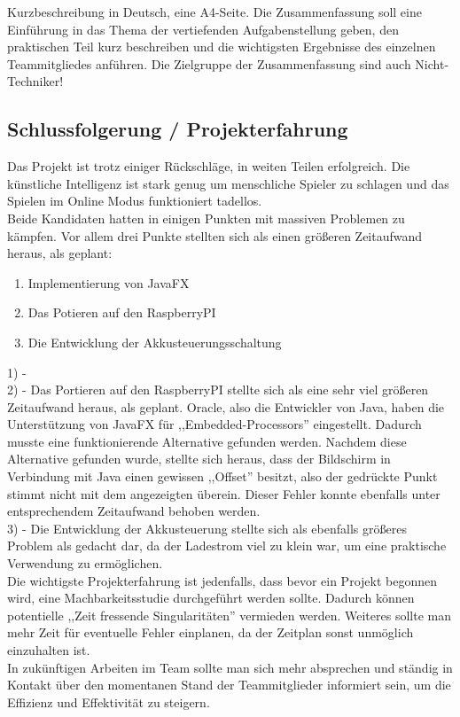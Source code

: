 \documentclass[12pt,a4paper]{article}
\newcommand{\yhbu}[0]{\color{ydkbu}}	%
\begin{document}
{	{\yhbu
	Kurzbeschreibung in Deutsch, eine A4-Seite.
	Die Zusammenfassung soll eine Einführung in das Thema
	der vertiefenden Aufgabenstellung geben,
	den praktischen Teil kurz beschreiben und die wichtigsten Ergebnisse
	des einzelnen Teammitgliedes anführen.
	Die Zielgruppe der Zusammenfassung sind auch Nicht-Techniker!
	}

\newpage
 \subsection{Schlussfolgerung / Projekterfahrung}
 
 Das Projekt ist trotz einiger Rückschläge, in weiten Teilen erfolgreich. Die künstliche Intelligenz ist stark genug um menschliche Spieler zu schlagen und das Spielen im Online Modus funktioniert tadellos. \\
 
	Beide Kandidaten hatten in einigen Punkten mit massiven Problemen zu kämpfen. Vor allem drei Punkte stellten sich als einen größeren Zeitaufwand heraus, als geplant:
\begin{enumerate}
	\item{Implementierung von JavaFX}
	\item{Das Potieren auf den RaspberryPI}
	\item{Die Entwicklung der Akkusteuerungsschaltung}
\end{enumerate}
1) - \\
2) - Das Portieren auf den RaspberryPI stellte sich als eine sehr viel größeren Zeitaufwand heraus, als geplant. Oracle, also die Entwickler von Java, haben die Unterstützung von JavaFX für ,,Embedded-Processors'' eingestellt. Dadurch musste eine funktionierende Alternative gefunden werden. Nachdem diese Alternative gefunden wurde, stellte sich heraus, dass der Bildschirm in Verbindung mit Java einen gewissen ,,Offset'' besitzt, also der gedrückte Punkt stimmt nicht mit dem angezeigten überein. Dieser Fehler konnte ebenfalls unter entsprechendem Zeitaufwand behoben werden. \\[1ex]
3) - Die Entwicklung der Akkusteuerung stellte sich als ebenfalls größeres Problem als gedacht dar, da der Ladestrom viel zu klein war, um eine praktische Verwendung zu ermöglichen. \\[2ex]
Die wichtigste Projekterfahrung ist jedenfalls, dass bevor ein Projekt begonnen wird, eine Machbarkeitsstudie durchgeführt werden sollte. Dadurch können potentielle ,,Zeit fressende Singularitäten'' vermieden werden. Weiteres sollte man mehr Zeit für eventuelle Fehler einplanen, da der Zeitplan sonst unmöglich einzuhalten ist. \\
In zukünftigen Arbeiten im Team sollte man sich mehr absprechen und ständig in Kontakt über den momentanen Stand der Teammitglieder informiert sein, um die Effizienz und Effektivität zu steigern.

}
\end{document}
